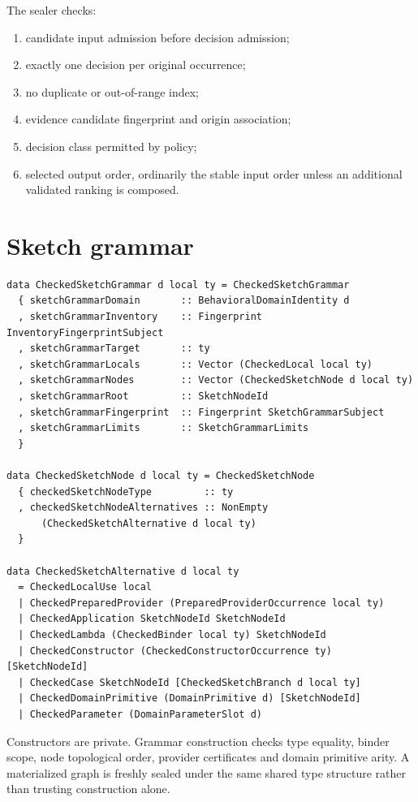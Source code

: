 \documentclass[11pt,oneside]{report}
\begin{document}
The sealer checks:

\begin{enumerate}[leftmargin=2em]
\item candidate input admission before decision admission;
\item exactly one decision per original occurrence;
\item no duplicate or out-of-range index;
\item evidence candidate fingerprint and origin association;
\item decision class permitted by policy;
\item selected output order, ordinarily the stable input order unless an additional validated ranking is composed.
\end{enumerate}

\section{Sketch grammar}

\begin{lstlisting}[language=HaskellX,caption={Typed sketch grammar with prepared occurrences.}]
data CheckedSketchGrammar d local ty = CheckedSketchGrammar
  { sketchGrammarDomain       :: BehavioralDomainIdentity d
  , sketchGrammarInventory    :: Fingerprint InventoryFingerprintSubject
  , sketchGrammarTarget       :: ty
  , sketchGrammarLocals       :: Vector (CheckedLocal local ty)
  , sketchGrammarNodes        :: Vector (CheckedSketchNode d local ty)
  , sketchGrammarRoot         :: SketchNodeId
  , sketchGrammarFingerprint  :: Fingerprint SketchGrammarSubject
  , sketchGrammarLimits       :: SketchGrammarLimits
  }

data CheckedSketchNode d local ty = CheckedSketchNode
  { checkedSketchNodeType         :: ty
  , checkedSketchNodeAlternatives :: NonEmpty
      (CheckedSketchAlternative d local ty)
  }

data CheckedSketchAlternative d local ty
  = CheckedLocalUse local
  | CheckedPreparedProvider (PreparedProviderOccurrence local ty)
  | CheckedApplication SketchNodeId SketchNodeId
  | CheckedLambda (CheckedBinder local ty) SketchNodeId
  | CheckedConstructor (CheckedConstructorOccurrence ty) [SketchNodeId]
  | CheckedCase SketchNodeId [CheckedSketchBranch d local ty]
  | CheckedDomainPrimitive (DomainPrimitive d) [SketchNodeId]
  | CheckedParameter (DomainParameterSlot d)
\end{lstlisting}

Constructors are private. Grammar construction checks type equality, binder scope, node topological order, provider certificates and domain primitive arity. A materialized graph is freshly sealed under the same shared type structure rather than trusting construction alone.
\end{document}

